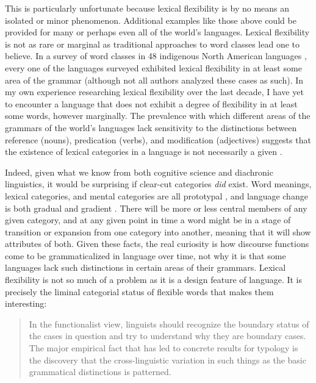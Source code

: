 This is particularly unfortunate because lexical flexibility is by no means an isolated or minor phenomenon. Additional examples like those above could be provided for many or perhaps even all of the world's languages. Lexical flexibility is not as rare or marginal as traditional approaches to word classes lead one to believe. In a survey of word classes in 48 indigenous North American languages , every one of the languages surveyed exhibited lexical flexibility in at least some area of the grammar (although not all authors analyzed these cases as such). In my own experience researching lexical flexibility over the last decade, I have yet to encounter a language that does not exhibit a degree of flexibility in at least some words, however marginally. The prevalence with which different areas of the grammars of the world's languages lack sensitivity to the distinctions between reference (nouns), predication (verbs), and modification (adjectives) suggests that the existence of lexical categories in a language is not necessarily a given .

Indeed, given what we know from both cognitive science and diachronic linguistics, it would be surprising if clear-cut categories \emph{did} exist. Word meanings, lexical categories, and mental categories are all prototypal  , and language change is both gradual and gradient . There will be more or less central members of any given category, and at any given point in time a word might be in a stage of transition or expansion from one category into another, meaning that it will show attributes of both. Given these facts, the real curiosity is how discourse functions come to be grammaticalized in language over time, not why it is that some languages lack such distinctions in certain areas of their grammars. Lexical flexibility is not so much of a problem as it is a design feature of language. It is precisely the liminal categorial status of flexible words that makes them interesting:

\blockquote[]{In the functionalist view, linguists should recognize the boundary status of the cases in question and try to understand why they are boundary cases. The major empirical fact that has led to concrete results for typology is the discovery that the cross-linguistic variation in such things as the basic grammatical distinctions is patterned.}

